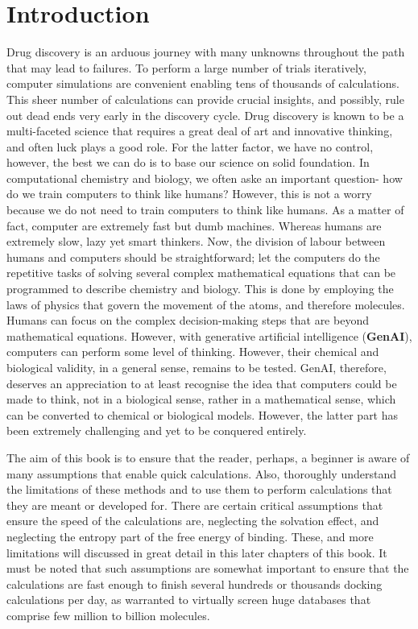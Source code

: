 \chapter*{Introduction}
Drug discovery is an arduous journey with many unknowns throughout the path that may lead to failures. To perform a large number of trials iteratively, computer simulations are convenient enabling tens of thousands of calculations. This sheer number of calculations can provide crucial insights, and possibly, rule out dead ends very early in the discovery cycle. Drug discovery is known to be a multi-faceted science that requires a great deal of art and innovative thinking, and often luck plays a good role. For the latter factor, we have no control, however, the best we can do is to base our science on solid foundation. In computational chemistry and biology, we often aske an important question- how do we train computers to think like humans? However, this is not a worry because we do not need to train computers to think like humans. As a matter of fact, computer are extremely fast but dumb machines. Whereas humans are extremely slow, lazy yet smart thinkers. Now, the division of labour between humans and computers should be straightforward; let the computers do the repetitive tasks of solving several complex mathematical equations that can be programmed to describe chemistry and biology. This is done by employing the laws of physics that govern the movement of the atoms, and therefore molecules. Humans can focus on the complex decision-making steps that are beyond mathematical equations. However, with generative artificial intelligence (\textbf{GenAI}), computers can perform some level of thinking. However, their chemical and biological validity, in a general sense, remains to be tested. GenAI, therefore, deserves an appreciation to at least recognise the idea that computers could be made to think, not in a biological sense, rather in a mathematical sense, which can be converted to chemical or biological models. However, the latter part has been extremely challenging and yet to be conquered entirely. 

The aim of this book is to ensure that the reader, perhaps, a beginner is aware of many assumptions that enable quick calculations. Also, thoroughly understand the limitations of these methods and to use them to perform calculations that they are meant or developed for. There are certain critical assumptions that ensure the speed of the calculations are, neglecting the solvation effect, and neglecting the entropy part of the free energy of binding. These, and more limitations will discussed in great detail in this later chapters of this book. It must be noted that such assumptions are somewhat important to ensure that the calculations are fast enough to finish several hundreds or thousands docking calculations per day, as warranted to virtually screen huge databases that comprise few million to billion molecules. 

